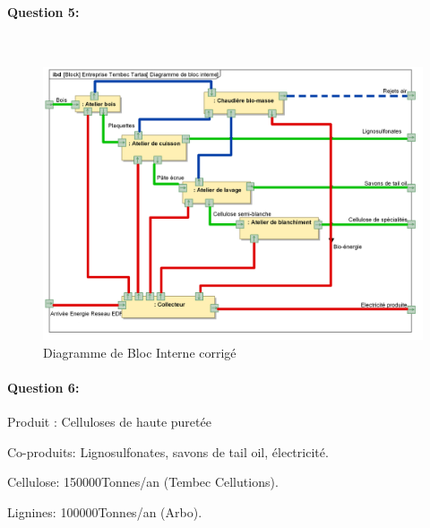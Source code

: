 \paragraph{Question 5:}

~\

\begin{figure}[!h]
\begin{center}
\includegraphics[width=\linewidth]{img/Tartas_interne_cor}
\caption{Diagramme de Bloc Interne corrigé}
\label{fig:tartas_in_cor}
\end{center}
\end{figure}


\paragraph{Question 6:} 

Produit : Celluloses de haute puretée

Co-produits: Lignosulfonates, savons de tail oil, électricité.

Cellulose: 150000Tonnes/an (Tembec Cellutions).

Lignines: 100000Tonnes/an (Arbo).


